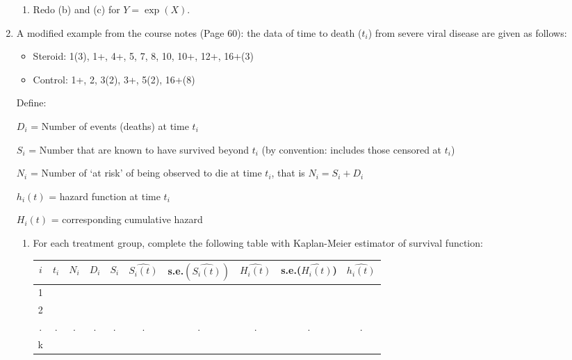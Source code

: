 \begin{enumerate}
\begin{enumerate}
\item Redo (b) and (c) for $Y= \exp(X)$.
 
\end{enumerate}


\vspace{14 cm}

\item A modified example from the course notes (Page 60): the data of time to death ($t_i$) from severe viral disease are given as follows:

\begin{itemize}
\item Steroid: 1(3), 1+, 4+, 5, 7, 8, 10, 10+, 12+, 16+(3)
\item Control: 1+, 2, 3(2), 3+, 5(2), 16+(8)
\end{itemize}

Define:

$D_i$ = Number of events (deaths) at time $t_i$

$S_i$ = Number that are known to have survived beyond $t_i$ (by convention: includes those censored at $t_i$)

$N_i$ = Number of `at risk' of being observed to die at time $t_i$, that is $N_i= S_i + D_i$

$h_i(t)$ = hazard function at time $t_i$

$H_i(t)$ = corresponding cumulative hazard

\begin{enumerate}
\item For each treatment group, complete the following table with Kaplan-Meier estimator of survival function:

\begin{center}

\begin{tabular}{|c|c|c|c|c|c|c|c|c|c|}
 \hline
\hline
 $i$ & $t_i$ & $N_i$  & $D_i$ & $S_i$ & $\hat{S_i (t)}$ & s.e.$(\hat{S_i(t)})$ & $\hat{H_i(t)}$ & s.e.($\hat{H_i(t)}$) & $\hat{h_i(t)}$ 
\\
\hline
1 & & & & & & & & &\\
\hline
2 & & & & & & & & &\\
\hline
.& .& . & . & .& .&. &. &. &.\\
\hline
k & & & & & & & & &\\
\hline
\hline

\end{tabular}
\end{center}


\end{enumerate}
\end{enumerate}
